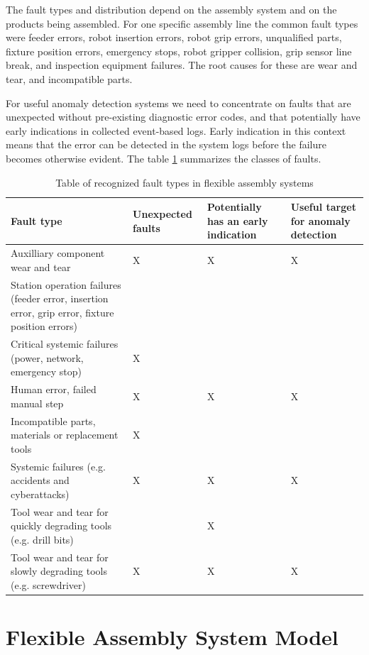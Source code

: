 \documentclass[procedia]{easychair}
\begin{document}
The fault types and distribution depend on the assembly system
and on the products being assembled. For one
specific assembly line \cite{cong1997fault} the common fault types were feeder errors, robot insertion errors,
robot grip errors, unqualified parts, fixture position errors, emergency stops, robot gripper collision,
grip sensor line break, and inspection equipment failures. The root causes for these are wear and tear, and incompatible parts.

For useful anomaly detection systems we need to concentrate on faults that are unexpected without pre-existing diagnostic error codes, and that potentially have early indications
in collected event-based logs. Early indication in this context means that the error can be detected in the system logs before the failure becomes otherwise evident.
The table \ref{faults} summarizes the classes of faults.

\begin{table}[!t]
\renewcommand{\arraystretch}{1.3}
\caption{Table of recognized fault types in flexible assembly systems}
\label{faults}
\centering
\begin{tabular}{|p{50mm}|p{25mm}|p{25mm}|p{25mm}|}
\hline
Fault type & Unexpected faults & Potentially has an early indication & Useful target for anomaly detection \\
\hline
\hline
Auxilliary component wear and tear & X & X & X \\
\hline
Station operation failures (feeder error, insertion error, grip error, fixture position errors) & & & \\
\hline
Critical systemic failures (power, network, emergency stop) & X & & \\
\hline
Human error, failed manual step & X & X & X \\
\hline
Incompatible parts, materials or replacement tools & X & & \\
\hline
Systemic failures (e.g. accidents and cyberattacks) & X & X & X \\
\hline
Tool wear and tear for quickly degrading tools (e.g. drill bits) & & X & \\
\hline
Tool wear and tear for slowly degrading tools (e.g. screwdriver) & X & X & X \\
\hline
\end{tabular}
\end{table}

\section{Flexible Assembly System Model}
\end{document}
